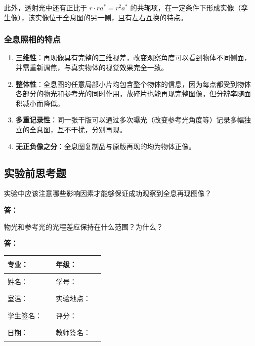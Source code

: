 \documentclass[dvipsnames, svgnames,a4paper,11pt]{article}
\newcommand{\answerblank}[1][3.8cm]{%
  \par\nopagebreak[4]\noindent\textbf{答：}\par\nopagebreak[4]\vspace*{#1}}
\begin{document}
此外，透射光中还有正比于 $r \cdot r a^* = r^2 a^*$ 的共轭项，在一定条件下形成实像（孪生像），该实像位于全息图的另一侧，且有左右互换的特点。

\subsubsection{全息照相的特点}

\begin{enumerate}
	\item \textbf{三维性}：再现像具有完整的三维视差，改变观察角度可以看到物体不同侧面，并需重新调焦，与真实物体的视觉效果完全一致。
	\item \textbf{整体性}：全息图的任意局部小片均包含整个物体的信息，因为每点都受到物体各部分的物光和参考光的同时作用，故碎片也能再现完整图像，但分辨率随面积减小而降低。
	\item \textbf{多重记录性}：同一张干版可以通过多次曝光（改变参考光角度等）记录多幅独立的全息图，互不干扰，分别再现。
	\item \textbf{无正负像之分}：全息图复制品与原版再现的均为物体正像。
\end{enumerate}



\subsection{实验前思考题}

\begin{question}
	实验中应该注意哪些影响因素才能够保证成功观察到全息再现图像？
\end{question}
\answerblank[3.8cm]

\begin{question}
	物光和参考光的光程差应保持在什么范围？为什么？
\end{question}
\answerblank[3.8cm]

\clearpage
\begin{table}
	\renewcommand\arraystretch{1.7}
	\centering
	\begin{tabularx}{\textwidth}{|X|X|X|X|}
	\hline
	专业：& \rule{2.5cm}{0.4pt} & 年级：& \rule{2.5cm}{0.4pt} \\
	\hline
	姓名：&\rule{2.5cm}{0.4pt} & 学号：&\rule{3cm}{0.4pt} \\
	\hline
	室温：& \rule{2.5cm}{0.4pt} & 实验地点：& \rule{2.5cm}{0.4pt} \\
	\hline
	学生签名：&\rule{2.5cm}{0.4pt} & 评分：& \\
	\hline
	日期：& \rule{3cm}{0.4pt} & 教师签名：& \rule{3cm}{0.4pt} \\
	\hline
	\end{tabularx}
\end{table}
\end{document}

